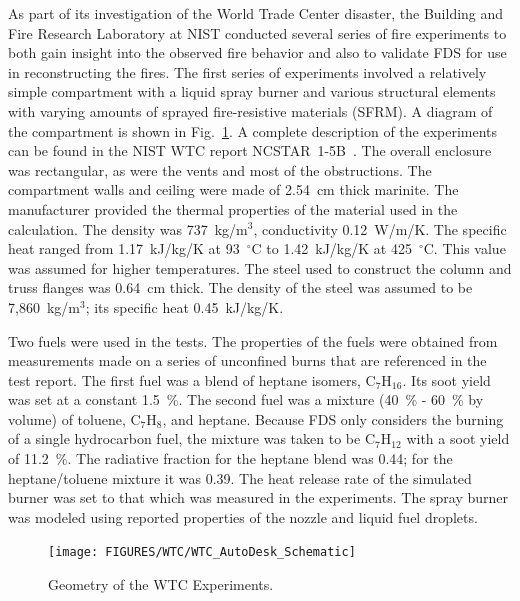 As part of its investigation of the World Trade Center disaster, the Building and Fire Research Laboratory at NIST conducted several series of fire experiments to both gain insight into the
observed fire behavior and also to validate FDS for use in reconstructing the fires. The first series of experiments involved a relatively simple compartment with a liquid spray burner and
various structural elements with varying amounts of sprayed fire-resistive materials (SFRM). A diagram of the compartment is shown in Fig.~\ref{WTC_Drawing}.
A complete description of the experiments can be found in the NIST WTC report NCSTAR~1-5B~\cite{NIST_NCSTAR_1-5B}.
The overall enclosure was rectangular, as were the vents and most of the obstructions. The compartment walls and ceiling were made of 2.54~cm thick marinite. The manufacturer provided the thermal properties of the material used in the calculation. The density was 737~kg/m$^3$, conductivity 0.12~W/m/K. The specific heat ranged from 1.17~kJ/kg/K at 93~$^\circ$C to
1.42~kJ/kg/K at 425~$^\circ$C. This value was assumed for higher temperatures.
The steel used to construct the column and truss flanges was 0.64~cm thick.  The density of the steel was assumed to be 7,860~kg/m$^3$; its specific heat 0.45~kJ/kg/K.

Two fuels were used in the tests. The properties of the fuels were obtained from measurements made on a series of unconfined burns that are referenced in the test report.
The first fuel was a blend of heptane isomers, C$_7$H$_{16}$. Its soot yield was set at a constant 1.5~\%. The second fuel was a mixture (40~\% - 60~\% by volume) of toluene, C$_7$H$_8$,
and heptane. Because FDS only considers the burning of a single hydrocarbon fuel, the mixture was taken to be C$_7$H$_{12}$ with a soot yield of 11.2~\%.
The radiative fraction for the heptane blend was 0.44; for the heptane/toluene mixture it was 0.39.
The heat release rate of the simulated burner was set to that which was measured in the experiments. The spray burner was modeled using reported properties of the nozzle and
liquid fuel droplets.

\begin{figure}
\begin{center}
\texttt{[image: FIGURES/WTC/WTC\_AutoDesk\_Schematic]}
\end{center}
\caption{Geometry of the WTC Experiments.}
\label{WTC_Drawing}
\end{figure}

\clearpage







